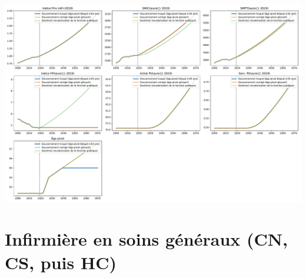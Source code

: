 
 \begin{center}\includegraphics[width=1\textwidth]{fig/comparaison_modeles.pdf}\end{center} 

\newpage 
 
\chapter{Infirmière en soins généraux (CN, CS, puis HC)} 

